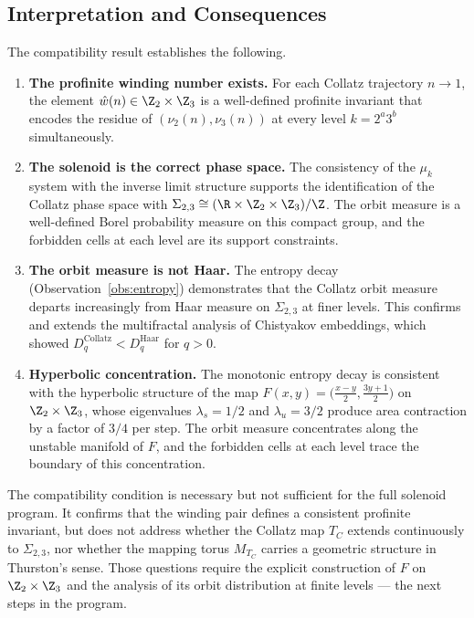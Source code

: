 \subsection{Interpretation and Consequences}

The compatibility result establishes the following.

\begin{enumerate}
    \item \textbf{The profinite winding number exists.}
    For each Collatz trajectory $n \to 1$, the element
    $\hat{w}(n) \in \Z_2 \times \Z_3$ is a well-defined profinite
    invariant that encodes the residue of $(\nu_2(n), \nu_3(n))$ at
    every level $k = 2^a 3^b$ simultaneously.

    \item \textbf{The solenoid is the correct phase space.}
    The consistency of the $\mu_k$ system with the inverse limit
    structure supports the identification of the Collatz phase space
    with $\Sigma_{2,3} \cong (\R \times \Z_2 \times \Z_3)/\Z$.
    The orbit measure is a well-defined Borel probability measure on
    this compact group, and the forbidden cells at each level are its
    support constraints.

    \item \textbf{The orbit measure is not Haar.}
    The entropy decay (Observation~\ref{obs:entropy}) demonstrates
    that the Collatz orbit measure departs increasingly from Haar
    measure on $\Sigma_{2,3}$ at finer levels.  This confirms and
    extends the multifractal analysis of Chistyakov embeddings, which
    showed $D_q^{\text{Collatz}} < D_q^{\text{Haar}}$ for $q > 0$.

    \item \textbf{Hyperbolic concentration.}
    The monotonic entropy decay is consistent with the hyperbolic
    structure of the map $F(x,y) = \bigl(\frac{x-y}{2},
    \frac{3y+1}{2}\bigr)$ on $\Z_2 \times \Z_3$, whose eigenvalues
    $\lambda_s = 1/2$ and $\lambda_u = 3/2$ produce area contraction
    by a factor of $3/4$ per step.  The orbit measure concentrates
    along the unstable manifold of $F$, and the forbidden cells at
    each level trace the boundary of this concentration.
\end{enumerate}

\begin{remark}
    The compatibility condition is necessary but not sufficient for
    the full solenoid program.  It confirms that the winding pair
    defines a consistent profinite invariant, but does not address
    whether the Collatz map $T_C$ extends continuously to
    $\Sigma_{2,3}$, nor whether the mapping torus $M_{T_C}$ carries
    a geometric structure in Thurston's sense.  Those questions require
    the explicit construction of $F$ on $\Z_2 \times \Z_3$ and the
    analysis of its orbit distribution at finite levels --- the next
    steps in the program.
\end{remark}
